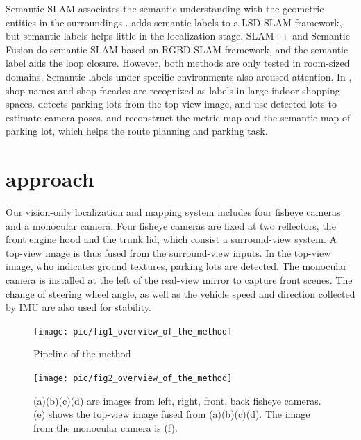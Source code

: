 \documentclass[journal]{IEEEtran}
\begin{document}

Semantic SLAM associates the semantic understanding with the geometric entities in the surroundings \cite{Cadena:2016fp}. \cite{Li2016Semi} adds semantic labels to a LSD-SLAM framework, but semantic labels helps little in the localization stage. 
SLAM++ \cite{Salas2013SLAM} and Semantic Fusion \cite{Mccormac2017SemanticFusion} do semantic SLAM based on RGBD SLAM framework, and the semantic label aids the loop closure. 
However, both methods are only tested in room-sized domains. Semantic labels under specific environments also aroused attention. 
In \cite{Wang2015Lost}, shop names and shop facades are recognized as labels in large indoor shopping spaces. 
\cite{Houben:2015hq} detects parking lots from the top view image, and use detected lots to estimate camera poses. 
\cite{Grimmett2015Integrating} and \cite{Himstedt2017Online} reconstruct the metric map and the semantic map of parking lot, which helps the route planning and parking task.



\section{approach}

Our vision-only localization and mapping system includes four fisheye cameras and a monocular camera. 
Four fisheye cameras are fixed at two reflectors, the front engine hood and the trunk lid, which consist a surround-view system. 
A top-view image is thus fused from the surround-view inputs. In the top-view image, who indicates ground textures, parking lots are detected. 
The monocular camera is installed at the left of the real-view mirror to capture front scenes. 
The change of steering wheel angle, as well as the vehicle speed and direction collected by IMU are also used for stability.

\begin{figure}[htbp]
\centering
\texttt{[image: pic/fig1\_overview\_of\_the\_method]}
\caption{Pipeline of the method}\label{fig:1}
\end{figure}

\begin{figure}
\centering
\texttt{[image: pic/fig2\_overview\_of\_the\_method]}
\caption{
(a)(b)(c)(d) are images from left, right, front, back fisheye cameras. 
(e) shows the top-view image fused from (a)(b)(c)(d). The image from the monocular camera is (f). 
}\label{fig:2}
\end{figure}
\end{document}
